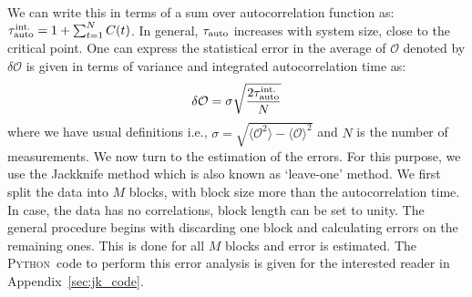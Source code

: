 \documentclass[letter,11pt]{article}
\newcommand{\PY}{\textsc{Python}}
\begin{document}
We can write this in terms of a sum over autocorrelation function as: $\tau_{\rm{auto}}^{\rm{int.}} = 1 + \sum_{t=1}^{N} C(t)$. In general, $ \tau_{\rm{auto}}$ increases with system size, close to the critical point. One 
can express the statistical error in the average of $\mathcal{O}$ denoted 
by $\delta \mathcal{O}$ is given in terms of variance and integrated autocorrelation time as:
\begin{equation}
	\delta \mathcal{O} = \sigma \sqrt{\frac{2 \tau_{\rm{auto}}^{\rm{int.}}}{N}}
\end{equation}
where we have usual definitions i.e., 
$\sigma = \sqrt{\langle \mathcal{O}^2\rangle - \langle \mathcal{O}\rangle^{2}}$ and $N$ is the number of measurements. We now turn to the estimation of the errors. For this purpose, we use the Jackknife method which is also known as `leave-one' method. We first split the data into $M$ blocks, with block size more than the autocorrelation time. In case, the data has no correlations, block length can be set to unity. The general procedure begins with discarding one block and calculating errors on the remaining ones. This is done for all $M$ blocks and error is estimated. The \PY~code to perform this error analysis is given for the interested reader in Appendix~\ref{sec:jk_code}. 

\end{document}
